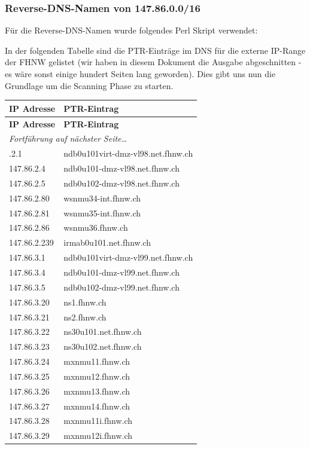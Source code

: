 \documentclass[a4paper,11pt]{scrartcl}
\begin{document}
\subsubsection{Reverse-DNS-Namen von 147.86.0.0/16}
Für die Reverse-DNS-Namen wurde folgendes Perl Skript verwendet:


In der folgenden Tabelle sind die PTR-Einträge im DNS für die externe IP-Range der FHNW gelistet (wir haben in diesem Dokument die Ausgabe abgeschnitten - es wäre sonst einige hundert Seiten lang geworden). Dies gibt uns nun die Grundlage um die Scanning Phase zu starten.
\begin{longtable}{p{2.5cm}|p{7cm}}
	\textbf{IP Adresse} & \textbf{PTR-Eintrag} \\
	\endfirsthead
	\textbf{IP Adresse} & \textbf{PTR-Eintrag} \\
	\endhead
	\multicolumn{2}{l}{\textit{Fortführung auf nächster Seite\ldots}} \\
	\endfoot
	\endlastfoot
	147.86.2.1 & ndb0u101virt-dmz-vl98.net.fhnw.ch \\ 
	147.86.2.4 & ndb0u101-dmz-vl98.net.fhnw.ch \\ 
	147.86.2.5 & ndb0u102-dmz-vl98.net.fhnw.ch \\ 
	147.86.2.80 & wsnmu34-int.fhnw.ch \\ 
	147.86.2.81 & wsnmu35-int.fhnw.ch \\ 
	147.86.2.86 & wsnmu36.fhnw.ch \\ 
	147.86.2.239 & irmab0u101.net.fhnw.ch \\ 
	147.86.3.1 & ndb0u101virt-dmz-vl99.net.fhnw.ch \\ 
	147.86.3.4 & ndb0u101-dmz-vl99.net.fhnw.ch \\ 
	147.86.3.5 & ndb0u102-dmz-vl99.net.fhnw.ch \\ 
	147.86.3.20 & ns1.fhnw.ch \\ 
	147.86.3.21 & ns2.fhnw.ch \\ 
	147.86.3.22 & ns30u101.net.fhnw.ch \\ 
	147.86.3.23 & ns30u102.net.fhnw.ch \\ 
	147.86.3.24 & mxnmu11.fhnw.ch \\ 
	147.86.3.25 & mxnmu12.fhnw.ch \\ 
	147.86.3.26 & mxnmu13.fhnw.ch \\ 
	147.86.3.27 & mxnmu14.fhnw.ch \\ 
	147.86.3.28 & mxnmu11i.fhnw.ch \\ 
	147.86.3.29 & mxnmu12i.fhnw.ch \\ 

\end{longtable}
\end{document}
